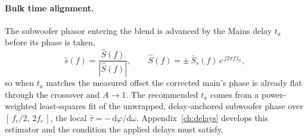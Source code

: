 \paragraph{Bulk time alignment.} The subwoofer phasor entering the blend is advanced by the Mains delay $t_a$ before its phase is taken,
\begin{equation}
  \hat s(f) = \frac{\hat S(f)}{|\hat S(f)|},\qquad
  \hat S(f) = \pm\,\bar S_s(f)\,e^{\,j 2\pi f\, t_a},
\end{equation}
so when $t_a$ matches the measured offset the corrected main's phase is already flat through the crossover and $A\to 1$. The recommended $t_a$ comes from a power-weighted least-squares fit of the unwrapped, delay-anchored subwoofer phase over $[\,f_c/2,\,2f_c\,]$, the local  $\hat\tau=-\,\mathrm{d}\varphi/\mathrm{d}\omega$. Appendix~\ref{ch:delays} develops this estimator and the condition the applied delays must satisfy.

